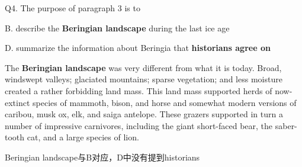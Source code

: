 \begin{blk}
    \begin{qst}
        Q4. The purpose of paragraph 3 is to
    \end{qst}

    \begin{chc}
        B. describe the \textbf{Beringian landscape} during the last ice age

        D. summarize the information about Beringia that \textbf{historians agree on}
    \end{chc}

    \begin{psgq}
        The \textbf{Beringian landscape} was very different from what it is today. Broad, windswept valleys; glaciated mountains; sparse vegetation; and less moisture created a rather forbidding land mass. This land mass supported herds of now-extinct species of mammoth, bison, and horse and somewhat modern versions of caribou, musk ox, elk, and saiga antelope. These grazers supported in turn a number of impressive carnivores, including the giant short-faced bear, the saber-tooth cat, and a large species of lion.
    \end{psgq}

    \begin{nlz}
        Beringian landscape与B对应，D中没有提到historians
    \end{nlz}
\end{blk}

